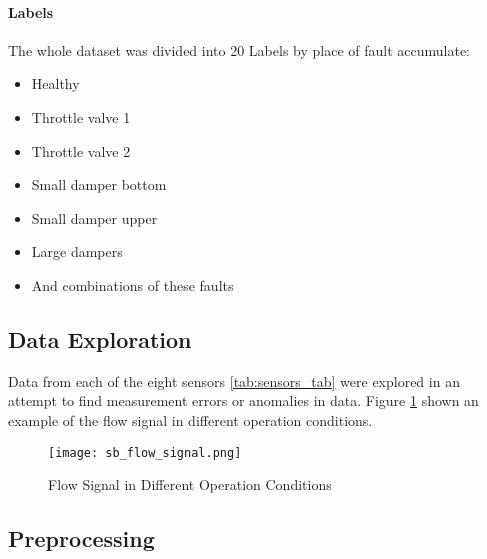 \paragraph{Labels}
The whole dataset was divided into 20 Labels by place of fault accumulate: 
\begin{itemize}
    \item Healthy
    \item Throttle valve 1
    \item Throttle valve 2 
    \item Small damper bottom
    \item Small damper upper
    \item Large dampers 
    \item And combinations of these faults
\end{itemize}

\subsection{Data Exploration}
Data from each of the eight sensors \ref{tab:sensors_tab} were explored in an attempt to find
measurement errors or anomalies in data.  Figure \ref{fig:flow_sig} shown
an example of the flow signal in different operation conditions. 

\begin{figure}[h!]
    \centering
    \texttt{[image: sb\_flow\_signal.png]}
    \caption{Flow Signal in Different Operation Conditions}
    \label{fig:flow_sig}
\end{figure}



\subsection{Preprocessing}

